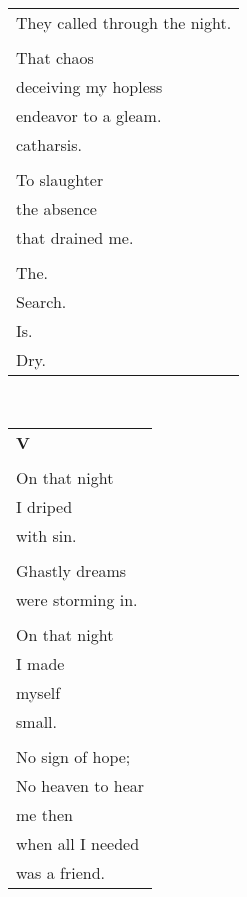 \documentclass{article}
\begin{document}
\begin{center}
\begin{tabular}{l}
They called through the night. \\
\\
That chaos \\
deceiving my hopless \\
endeavor to a gleam. \\
catharsis. \\
\\
To slaughter \\
the absence \\
that drained me. \\
\\
The. \\
\hh{}Search. \\
\hh{}\hh{}Is. \\
\hh{}\hh{}\hh{}Dry. \\
\end{tabular} \\
\begin{tabular}{l}
\\
\textbf{V} \\
\\
On that night \\
\hh{}I driped \\
\hh{}with sin. \\
\\
Ghastly dreams \\
were storming in. \\
\\
On that night \\
\hh{}I made \\
\hh{}myself \\
\hh{}small. \\
\\
No sign of hope; \\
No heaven to hear \\
me then \\
when all I needed \\
was a friend. \\
\end{tabular}
\end{center}
\end{document}
